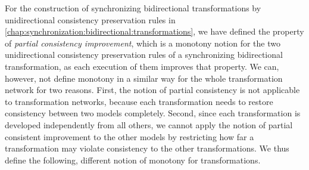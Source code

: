 For the construction of synchronizing bidirectional transformations by unidirectional consistency preservation rules in \autoref{chap:synchronization:bidirectional:transformations}, we have defined the property of \emph{partial consistency improvement}, which is a monotony notion for the two unidirectional consistency preservation rules of a synchronizing bidirectional transformation, as each execution of them improves that property.
We can, however, not define monotony in a similar way for the whole transformation network for two reasons.
First, the notion of partial consistency is not applicable to transformation networks, because each transformation needs to restore consistency between two models completely.
Second, since each transformation is developed independently from all others, we cannot apply the notion of partial consistent improvement to the other models by restricting how far a transformation may violate consistency to the other transformations.
%
We thus define the following, different notion of monotony for transformations.
